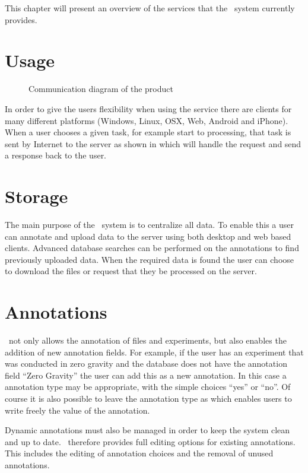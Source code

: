 


This chapter will present an overview of the services that the \appName\ system currently provides. 

\section{Usage}



\begin{figure}[h]
\caption{Communication diagram of the product}
\label{con_serviceDescription}
\end{figure}
	
In order to give the users flexibility when using the service there are clients for many different platforms (Windows, Linux, OSX, Web, Android and iPhone). 
When a user chooses a given task, for example start  to  processing, that task is sent by Internet to the server as shown in  which will handle the request and send a response back to the user.

\section{Storage}
The main purpose of the \appName\ system is to centralize all data. To enable this a user can annotate and upload data to the server using both desktop and web based clients.
Advanced database searches can be performed on the annotations to find previously uploaded data. When the required data is found the user can choose to download the files or request that they be processed on the server.

\section{Annotations}
\appName\  not only allows the annotation of files and experiments, but also enables the addition of new annotation fields. For example, if the user has an experiment that was conducted in zero gravity and the database does not have the annotation field ``Zero Gravity'' the user can add this as a new annotation. In this case a  annotation type may be appropriate, with the simple choices ``yes'' or ``no''. Of course it is also possible to leave the annotation type as  which enables users to write  freely the value of the annotation.

Dynamic annotations must also be managed in order to keep the system clean and up to date. \appName\ therefore provides full editing options for existing annotations. This includes the editing of  annotation choices and the removal of unused annotations.

